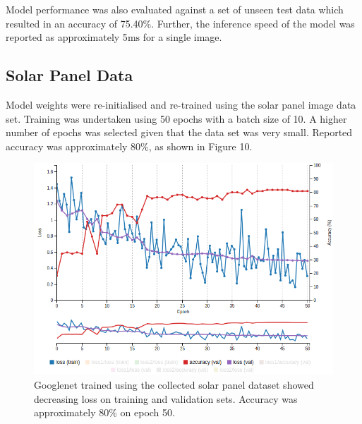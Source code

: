 \documentclass[10pt,journal,compsoc]{IEEEtran}
\begin{document}
		Model performance was also evaluated against a set of unseen test data which resulted in an accuracy of 75.40\%. Further, the inference speed of the model was reported as approximately 5$\si{\milli\second}$ for a single image.
		
		\subsection{Solar Panel Data}
		Model weights were re-initialised and re-trained using the solar panel image data set. Training was undertaken using 50 epochs with a batch size of 10. A higher number of epochs was selected given that the data set was very small. Reported accuracy was approximately 80\%, as shown in Figure 10. 
		\begin{figure}[h]
			\centering
			\includegraphics[scale=0.3]{googlenet_train_img}
			\caption{Googlenet trained using the collected solar panel dataset showed decreasing loss on training and validation sets. Accuracy was approximately 80\% on epoch 50.}
		\end{figure}
		
\end{document}
